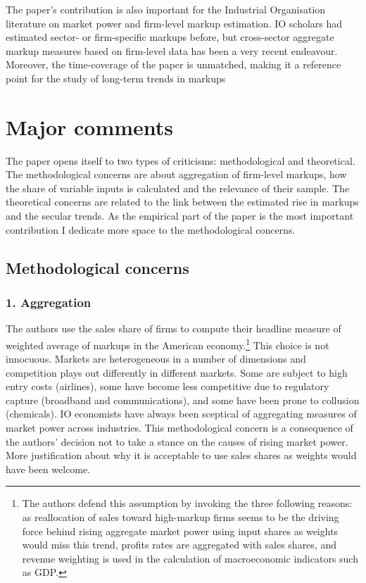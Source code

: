 \documentclass{amsart}
\theoremstyle{definition}
\theoremstyle{remark}
\numberwithin{equation}{section}
\begin{document}
The paper's contribution is also important for the Industrial Organisation literature on market power and firm-level markup estimation. IO scholars had estimated sector- or firm-specific markups before, but cross-sector aggregate markup measures based on firm-level data has been a very recent endeavour. Moreover, the time-coverage of the paper is unmatched, making it a reference point for the study of long-term trends in markups


\section*{Major comments}

The paper opens itself to two types of criticisms: methodological and theoretical. The methodological concerns are about aggregation of firm-level markups, how the share of variable inputs is calculated and the relevance of their sample. The theoretical concerns are related to the link between the estimated rise in markups and the secular trends. As the empirical part of the paper is the most important contribution I dedicate more space to the methodological concerns.

\subsection*{Methodological concerns}

\subsubsection*{1. Aggregation} The authors use the sales share of firms to compute their headline measure of weighted average of markups in the American economy.\footnote{The authors defend this assumption by invoking the three following reasons: as reallocation of sales toward high-markup firms seems to be the driving force behind rising aggregate market power using input shares as weights would miss this trend, profits rates are aggregated with sales shares, and revenue weighting is used in the calculation of macroeconomic indicators such as GDP.} This choice is not innocuous. Markets are heterogeneous in a number of dimensions and competition plays out differently in different markets. Some are subject to high entry costs (airlines), some have become less  competitive due to regulatory capture (broadband and communications), and some have been prone to collusion (chemicals). IO economists have always been sceptical of aggregating measures of market power across industries. This methodological concern is a consequence of the authors' decision not to take a stance on the causes of rising market power. More justification about why it is acceptable to use sales shares as weights would have been welcome.\\
\end{document}
